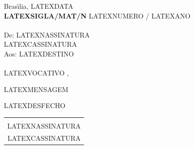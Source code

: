 \documentclass[12pt]{artigo}
\begin{document}
\setlength{\baselineskip}{8mm} 

\vdois
\timbrado

\noindent
\hfill Bras\'{\i}lia, LATEXDATA
\vspace*{5mm} \\
{\bf LATEXSIGLA/MAT/N\primo} LATEXNUMERO / LATEXANO \\
\vspace*{5mm} \\
De:  LATEXNASSINATURA \\
\hdez 
{\small LATEXCASSINATURA}
\\
Aos: LATEXDESTINO
\\ 
\vspace*{10mm} \\

LATEXVOCATIVO ,

\bigskip

LATEXMENSAGEM
\vspace*{1.5cm}

\hspace*{5cm}
\begin{minipage}{9cm}
\begin{center}
LATEXDESFECHO\,
\vspace*{1.5cm} 
\\
\begin{tabular}{c}
\hline \vspace*{-5mm} \\
LATEXNASSINATURA \\
{\small LATEXCASSINATURA}
\end{tabular}
\\
\end{center} 
\end{minipage}
\end{document}
